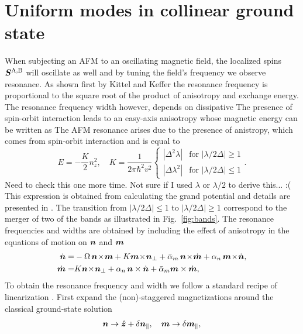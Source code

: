 \section{Uniform modes in collinear ground state}
When subjecting an AFM to an oscillating magnetic field, the localized spins $\boldsymbol{S}^\text{A,B}$ will oscillate as well and by tuning the field's frequency we observe resonance. As shown first by Kittel and Keffer \cite{kittel} the resonance frequency is proportional to the square root of the product of anisotropy and exchange energy. The resonance frequency width however, depends on dissipative 
The presence of spin-orbit interaction leads to an easy-axis anisotropy whose magnetic energy can be written as The AFM resonance arises due to the presence of anistropy, which comes from spin-orbit interaction and is equal to
\begin{equation}
    E = -\frac{K}{2}n_z^2, \quad K= \frac{1}{2\pi\hbar^2v^2}\begin{cases}
    |\Delta^2\lambda| & \text{for } |\lambda/2\Delta| \geq 1 \\
    |\Delta\lambda^2| & \text{for } |\lambda/2\Delta| \leq 1
    \end{cases}.
\end{equation}
{\color{blue} Need to check this one more time. Not sure if I used $\lambda$ or $\lambda/2$ to derive this... :(\\}
This expression is obtained from calculating the grand potential and details are presented in \cite{supplementary}. The transition from $|\lambda/2\Delta|\le1$ to $|\lambda/2\Delta|\ge1$ correspond to the merger of two of the bands as illustrated in Fig.~\ref{fig:bands}. The resonance frequencies and widths are obtained by including the effect of anisotropy in the equations of motion on $\boldsymbol{n}$ and $\boldsymbol{m}$
\beml
\label{AFMEOM2}
\begin{align}
\label{ndot2}
\dot{\bb{n}} =& -\Omega\, \bb{n}\!\times\!\bb{m} +K \bb{m}\!\times\!\bb{n}_\perp+\bar{\alpha}_m\,\bb{n}\!\times\!\dot{\bb{m}}+\alpha_n\,\bb{m}\!\times\! \dot{\bb{n}},\\
\label{mdot2}
\dot{\bb{m}} =&K  \bb{n}\!\times\!\bb{n}_\perp+\alpha_n\,\bb{n} \times \dot{\bb{n}}+\bar{\alpha}_m \bb{m} \times \dot{\bb{m}} ,
\end{align}
\eml
To obtain the resonance frequency and width we follow a standard recipe of linearization \cite{kittel}. First expand the (non)-staggered magnetizations around the classical ground-state solution
\begin{align}
    \boldsymbol{n}\rightarrow\hat{\boldsymbol{z}} + \delta\boldsymbol{n}_\parallel,\quad \boldsymbol{m}\rightarrow \delta\boldsymbol{m}_\parallel,
\end{align} 

